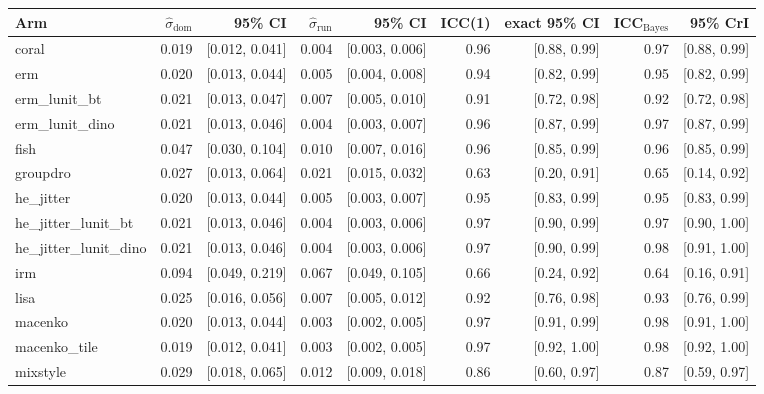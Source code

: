 \begin{tabular}{lrrrrrrrr}
\toprule
Arm & $\hat\sigma_\text{dom}$ & 95\% CI & $\hat\sigma_\text{run}$ & 95\% CI & ICC(1) & exact 95\% CI & ICC$_\text{Bayes}$ & 95\% CrI \\
\midrule
coral & 0.019 & [0.012, 0.041] & 0.004 & [0.003, 0.006] & 0.96 & [0.88, 0.99] & 0.97 & [0.88, 0.99] \\
erm & 0.020 & [0.013, 0.044] & 0.005 & [0.004, 0.008] & 0.94 & [0.82, 0.99] & 0.95 & [0.82, 0.99] \\
erm\_lunit\_bt & 0.021 & [0.013, 0.047] & 0.007 & [0.005, 0.010] & 0.91 & [0.72, 0.98] & 0.92 & [0.72, 0.98] \\
erm\_lunit\_dino & 0.021 & [0.013, 0.046] & 0.004 & [0.003, 0.007] & 0.96 & [0.87, 0.99] & 0.97 & [0.87, 0.99] \\
fish & 0.047 & [0.030, 0.104] & 0.010 & [0.007, 0.016] & 0.96 & [0.85, 0.99] & 0.96 & [0.85, 0.99] \\
groupdro & 0.027 & [0.013, 0.064] & 0.021 & [0.015, 0.032] & 0.63 & [0.20, 0.91] & 0.65 & [0.14, 0.92] \\
he\_jitter & 0.020 & [0.013, 0.044] & 0.005 & [0.003, 0.007] & 0.95 & [0.83, 0.99] & 0.95 & [0.83, 0.99] \\
he\_jitter\_lunit\_bt & 0.021 & [0.013, 0.046] & 0.004 & [0.003, 0.006] & 0.97 & [0.90, 0.99] & 0.97 & [0.90, 1.00] \\
he\_jitter\_lunit\_dino & 0.021 & [0.013, 0.046] & 0.004 & [0.003, 0.006] & 0.97 & [0.90, 0.99] & 0.98 & [0.91, 1.00] \\
irm & 0.094 & [0.049, 0.219] & 0.067 & [0.049, 0.105] & 0.66 & [0.24, 0.92] & 0.64 & [0.16, 0.91] \\
lisa & 0.025 & [0.016, 0.056] & 0.007 & [0.005, 0.012] & 0.92 & [0.76, 0.98] & 0.93 & [0.76, 0.99] \\
macenko & 0.020 & [0.013, 0.044] & 0.003 & [0.002, 0.005] & 0.97 & [0.91, 0.99] & 0.98 & [0.91, 1.00] \\
macenko\_tile & 0.019 & [0.012, 0.041] & 0.003 & [0.002, 0.005] & 0.97 & [0.92, 1.00] & 0.98 & [0.92, 1.00] \\
mixstyle & 0.029 & [0.018, 0.065] & 0.012 & [0.009, 0.018] & 0.86 & [0.60, 0.97] & 0.87 & [0.59, 0.97] \\

\end{tabular}
